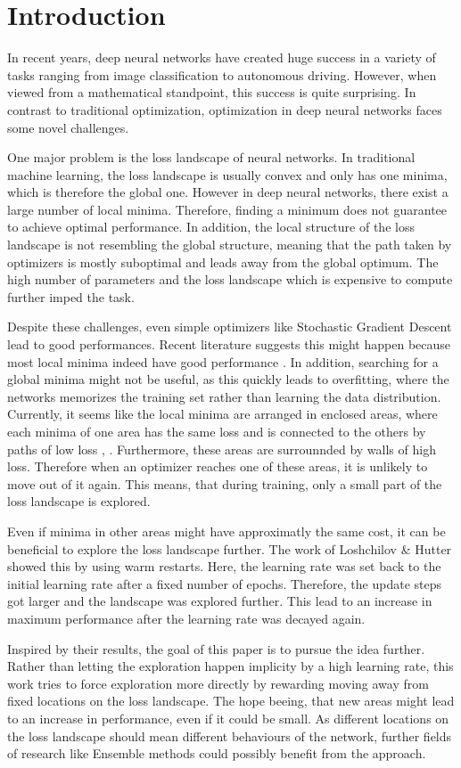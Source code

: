 \chapter{Introduction}\label{cha:Introduction}
In recent years, deep neural networks have created huge success in a variety of
tasks ranging from image classification to autonomous driving. However, when
viewed from a mathematical standpoint, this success is quite surprising. In
contrast to traditional optimization, optimization in deep neural networks faces
some novel challenges.

One major problem is the loss landscape of neural networks. In traditional
machine learning, the loss landscape is usually convex and only has one minima,
which is therefore the global one. However in deep neural networks, there exist
a large number of local minima. Therefore, finding a minimum does not guarantee
to achieve optimal performance. In addition, the local structure of the loss
landscape is not resembling the global structure, meaning that the path taken by
optimizers is mostly suboptimal and leads away from the global optimum. The high
number of parameters and the loss landscape which is expensive to compute
further imped the task.

Despite these challenges, even simple optimizers like Stochastic Gradient
Descent lead to good performances. Recent literature suggests this might
happen because most local minima indeed have good performance
\cite{choromanska2015loss}. In addition, searching for a global minima might not
be useful, as this quickly leads to overfitting, where the networks memorizes
the training set rather than learning the data distribution. Currently, it seems
like the local minima are arranged in enclosed areas, where each minima of one area has
the same loss and is connected to the others by paths of low loss \cite{he2020piecewise},
\cite{draxler2018essentially}. Furthermore, these areas are surrounnded by walls
of high loss. Therefore when an optimizer reaches one of these areas, it is
unlikely to move out of it again. This means, that during training, only a small
part of the loss landscape is explored.

Even if minima in other areas might have approximatly the same cost, it can be
beneficial to explore the loss landscape further. The work of Loshchilov \&
Hutter \cite{loshchilov2016sgdr} showed this by using warm restarts. Here, the
learning rate was set back to the initial learning rate after a fixed number of
epochs. Therefore, the update steps got larger and the landscape was explored
further. This lead to an increase in maximum performance after the learning rate
was decayed again.

Inspired by their results, the goal of this paper is to pursue the idea further.
Rather than letting the exploration happen implicity by a high learning rate,
this work tries to force exploration more directly by rewarding moving away from
fixed locations on the loss landscape. The hope beeing, that new areas might
lead to an increase in performance, even if it could be small. As different
locations on the loss landscape should mean different behaviours of the network,
further fields of research like Ensemble methods could possibly benefit from the
approach.

